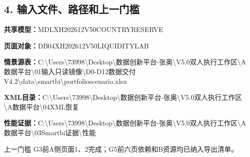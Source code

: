 \documentclass[UTF8,openany,zihao=-4]{ctexbook}
\renewcommand{\_}{\textunderscore\allowbreak}
\begin{document}
\subsection*{4. 输入文件、路径和上一门槛}
\noindent\textbf{共享模型：}{\promptlatin\promptcjk\small MDL\_\allowbreak{}XH202612\_\allowbreak{}V50\_\allowbreak{}COUNTRY\_\allowbreak{}RESERVE}\par
\noindent\textbf{页面对象：}{\promptlatin\promptcjk\small DB04\_\allowbreak{}XH202612\_\allowbreak{}V50\_\allowbreak{}LIQUIDITY\_\allowbreak{}LAB}\par
\noindent\textbf{情景源表：}{\promptlatin\promptcjk\small C:\textbackslash{}\allowbreak{}Users\textbackslash{}\allowbreak{}73998\textbackslash{}\allowbreak{}Desktop\textbackslash{}\allowbreak{}数据创新平台-\allowbreak{}张奥\textbackslash{}\allowbreak{}V5.0\_\allowbreak{}双人执行工作区\textbackslash{}\allowbreak{}A\_\allowbreak{}数据平台\textbackslash{}\allowbreak{}01\_\allowbreak{}输入只读镜像\textbackslash{}\allowbreak{}D0-\allowbreak{}D12\_\allowbreak{}数据交付\_\allowbreak{}V4.2\textbackslash{}\allowbreak{}data\textbackslash{}\allowbreak{}smartbi\textbackslash{}\allowbreak{}portfolio\_\allowbreak{}scenario.xlsx}\par
\noindent\textbf{XML目录：}{\promptlatin\promptcjk\small C:\textbackslash{}\allowbreak{}Users\textbackslash{}\allowbreak{}73998\textbackslash{}\allowbreak{}Desktop\textbackslash{}\allowbreak{}数据创新平台-\allowbreak{}张奥\textbackslash{}\allowbreak{}V5.0\_\allowbreak{}双人执行工作区\textbackslash{}\allowbreak{}A\_\allowbreak{}数据平台\textbackslash{}\allowbreak{}04\_\allowbreak{}XML恢复}\par
\noindent\textbf{性能证据：}{\promptlatin\promptcjk\small C:\textbackslash{}\allowbreak{}Users\textbackslash{}\allowbreak{}73998\textbackslash{}\allowbreak{}Desktop\textbackslash{}\allowbreak{}数据创新平台-\allowbreak{}张奥\textbackslash{}\allowbreak{}V5.0\_\allowbreak{}双人执行工作区\textbackslash{}\allowbreak{}A\_\allowbreak{}数据平台\textbackslash{}\allowbreak{}03\_\allowbreak{}Smartbi证据\textbackslash{}\allowbreak{}性能}\par
\begin{gatebox}{上一门槛}
G3前A侧页面1、2完成；G5前六页依赖和B资源均已纳入导出清单。

\end{gatebox}
\end{document}
